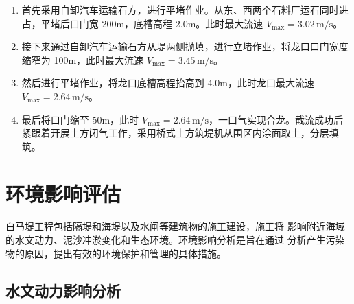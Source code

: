 \documentclass[UTF8, a4paper, 12pt]{ctexart} %
\begin{document}
\begin{enumerate}
    \item 首先采用自卸汽车运输石方，进行平堵作业。从东、西两个石料厂运石同时进占，平堵后口门宽 200m，底槽高程 2.0m。此时最大流速 $V_{\text{max}} = 3.02\,\text{m/s}$。
    
    \item 接下来通过自卸汽车运输石方从堤两侧抛填，进行立堵作业，将龙口口门宽度缩窄为 100m，此时最大流速 $V_{\text{max}} = 3.45\,\text{m/s}$。
    
    \item 然后进行平堵作业，将龙口底槽高程抬高到 4.0m，此时龙口最大流速 $V_{\text{max}} = 2.64\,\text{m/s}$。
    
    \item 最后将口门缩至 50m，此时 $V_{\text{max}} = 2.64\,\text{m/s}$，一口气实现合龙。截流成功后紧跟着开展土方闭气工作，采用桥式土方筑堤机从围区内涂面取土，分层填筑。
\end{enumerate}
\section{环境影响评估}
白马堤工程包括隔堤和海堤以及水闸等建筑物的施工建设，施工将
影响附近海域的水文动力、泥沙冲淤变化和生态环境。环境影响分析是旨在通过
分析产生污染物的原因，提出有效的环境保护和管理的具体措施。

\subsection{水文动力影响分析}
\end{document}

